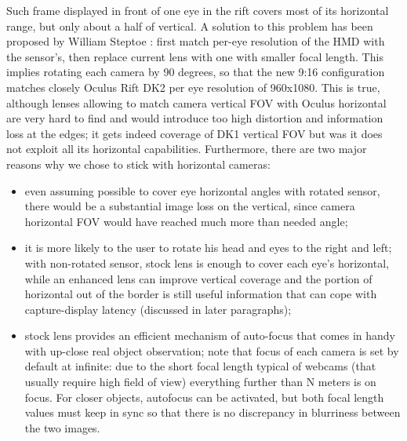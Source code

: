 Such frame displayed in front of one eye in the rift covers most of its horizontal range, but only about a half of vertical. A solution to this problem has been proposed by William Steptoe \cite{ar_rift}: first match per-eye resolution of the HMD with the sensor's, then replace current lens with one with smaller focal length. This implies rotating each camera by 90 degrees, so that the new 9:16 configuration matches closely Oculus Rift DK2 per eye resolution of 960x1080. This is true, although lenses allowing to match camera vertical FOV with Oculus horizontal are very hard to find and would introduce too high distortion and information loss at the edges; it gets indeed coverage of DK1 vertical FOV but was it does not exploit all its horizontal capabilities. Furthermore, there are two major reasons why we chose to stick with horizontal cameras:
\begin{itemize}
\item even assuming possible to cover eye horizontal angles with rotated sensor, there would be a substantial image loss on the vertical, since camera horizontal FOV would have reached much more than needed angle;
\item it is more likely to the user to rotate his head and eyes to the right and left; with non-rotated sensor, stock lens is enough to cover each eye's horizontal, while an enhanced lens can improve vertical coverage and the portion of horizontal out of the border is still useful information that can cope with capture-display latency (discussed in later paragraphs);
\item stock lens provides an efficient mechanism of auto-focus that comes in handy with up-close real object observation; note that focus of each camera is set by default at infinite: due to the short focal length typical of webcams (that usually require high field of view) everything further than N meters is on focus. For closer objects, autofocus can be activated, but both focal length values must keep in sync so that there is no discrepancy in blurriness between the two images.
\end{itemize}


